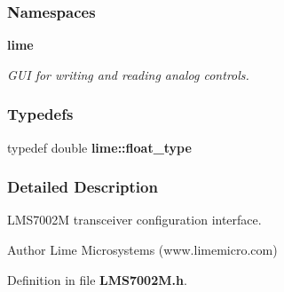 \subsubsection*{Namespaces}
\begin{DoxyCompactItemize}
\item 
 {\bf lime}
\begin{DoxyCompactList}\small\item\em G\+UI for writing and reading analog controls. \end{DoxyCompactList}\end{DoxyCompactItemize}
\subsubsection*{Typedefs}
\begin{DoxyCompactItemize}
\item 
typedef double {\bf lime\+::float\+\_\+type}
\end{DoxyCompactItemize}


\subsubsection{Detailed Description}
L\+M\+S7002M transceiver configuration interface. 

\begin{DoxyAuthor}{Author}
Lime Microsystems (www.\+limemicro.\+com) 
\end{DoxyAuthor}


Definition in file {\bf L\+M\+S7002\+M.\+h}.

